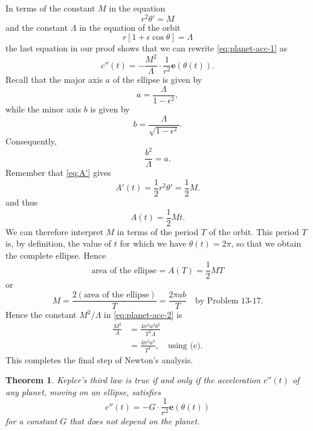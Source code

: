 \documentclass{article}
\newtheorem{theorem}{Theorem}
\begin{document}
In terms of the constant $M$ in the equation \[
  r^2\theta' = M
\] and the constant $\Lambda$ in the equation of the orbit \[
  r[1 + \epsilon \cos \theta] = \Lambda
\] the last equation in our proof shows that we can rewrite
\eqref{eq:planet-acc-1} as
\begin{equation} \label{eq:planet-acc-2} \tag{**}
  c''(t) = -\frac{M^2}{\Lambda} \cdot \frac{1}{r^2}\mathbf{e}(\theta(t)).
\end{equation}
Recall that the major axis $a$ of the ellipse is given by
\begin{equation} \label{eq:ell-a} \tag{a}
  a = \frac{\Lambda}{1 - \epsilon^2},
\end{equation}
while the minor axis $b$ is given by
\begin{equation} \label{eq:ell-b} \tag{b}
  b = \frac{\Lambda}{\sqrt{1 - \epsilon^2}}.
\end{equation}
Consequently,
\begin{equation} \label{eq:ell-c} \tag{c}
  \frac{b^2}{\Lambda} = a.
\end{equation}
Remember that \eqref{eq:A'} gives \[
  A'(t) = \frac{1}{2}r^2\theta' = \frac{1}{2}M.
\] and thus \[
  A(t) = \frac{1}{2}Mt.
\] We can therefore interpret $M$ in terms of the period $T$ of the orbit. This
period $T$ is, by definition, the value of $t$ for which we have $\theta(t) =
2\pi$, so that we obtain the complete ellipse. Hence \[
  \text{area of the ellipse} = A(T) = \frac{1}{2}MT
\] or \[
  M = \frac{2(\text{area of the ellipse})}{T} = \frac{2 \pi ab}{T} \quad
  \text{by Problem 13-17}.
\] Hence the constant $M^2/\Lambda$ in \eqref{eq:planet-acc-2} is
\begin{align*}
  \frac{M^2}{\Lambda}
  &= \frac{4 \pi^2 a^2 b^2}{T^2 \Lambda} \\
  &= \frac{4 \pi^2 a^3}{T^2}, \quad \text{using (c)}.
\end{align*} This completes the final step of Newton's analysis.

\begin{theorem}
  Kepler's third law is true if and only if the acceleration $c''(t)$ of any
  planet, moving on an ellipse, satisfies \[
    c''(t) = -G \cdot \frac{1}{r^2} \mathbf{e}(\theta(t))
  \] for a constant $G$ that does not depend on the planet.
\end{theorem}
\end{document}
